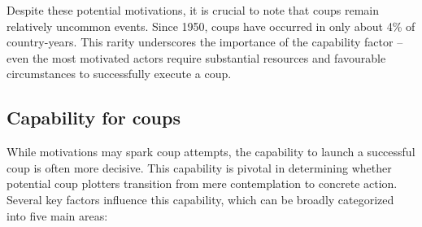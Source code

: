 \documentclass[
  12pt,
]{report}
\begin{document}
Despite these potential motivations, it is crucial to note that coups
remain relatively uncommon events. Since 1950, coups have occurred in
only about 4\% of country-years. This rarity underscores the importance
of the capability factor -- even the most motivated actors require
substantial resources and favourable circumstances to successfully
execute a coup.

\subsection{Capability for coups}\label{capability-for-coups}

While motivations may spark coup attempts, the capability to launch a
successful coup is often more decisive. This capability is pivotal in
determining whether potential coup plotters transition from mere
contemplation to concrete action. Several key factors influence this
capability, which can be broadly categorized into five main areas:
\end{document}
